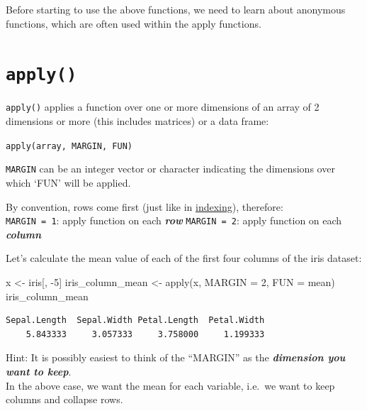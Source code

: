 \documentclass[
]{book}
\makeatletter
\newenvironment{Shaded}{\begin{snugshade}}{\end{snugshade}}
\newcommand{\AttributeTok}[1]{\textcolor[rgb]{0.77,0.63,0.00}{#1}}
\newcommand{\DecValTok}[1]{\textcolor[rgb]{0.00,0.00,0.81}{#1}}
\newcommand{\FunctionTok}[1]{\textcolor[rgb]{0.00,0.00,0.00}{#1}}
\newcommand{\NormalTok}[1]{#1}
\newcommand{\OtherTok}[1]{\textcolor[rgb]{0.56,0.35,0.01}{#1}}
\newcommand{\SpecialCharTok}[1]{\textcolor[rgb]{0.00,0.00,0.00}{#1}}
\newenvironment{kframe}{%
\medskip{}
\setlength{\fboxsep}{.8em}
 \def\at@end@of@kframe{}%
 \ifinner\ifhmode%
  \def\at@end@of@kframe{\end{minipage}}%
  \begin{minipage}{\columnwidth}%
 \fi\fi%
 \def\FrameCommand##1{\hskip\@totalleftmargin \hskip-\fboxsep
 \colorbox{shadecolor}{##1}\hskip-\fboxsep
     \hskip-\linewidth \hskip-\@totalleftmargin \hskip\columnwidth}%
 \MakeFramed {\advance\hsize-\width
   \@totalleftmargin\z@ \linewidth\hsize
   \@setminipage}}%
 {\par\unskip\endMakeFramed%
 \at@end@of@kframe}
\newenvironment{rmdblock}[1]
  {
  \begin{itemize}
  \renewcommand{\labelitemi}{
    \raisebox{-.7\height}[0pt][0pt]{
      {\setkeys{Gin}{width=3em,keepaspectratio}\texttt{[image: images/\#1]}}
    }
  }
  \setlength{\fboxsep}{1em}
  \begin{kframe}
  \item
  }
  {
  \end{kframe}
  \end{itemize}
  }
\newenvironment{note}
  {\begin{rmdblock}{note}}
  {\end{rmdblock}}
\newenvironment{info}
  {\begin{rmdblock}{info}}
  {\end{rmdblock}}
\makeatother
\begin{document}
Before starting to use the above functions, we need to learn about anonymous functions, which are often used within the apply functions.

\hypertarget{apply}{%
\section{\texorpdfstring{\texttt{apply()}}{apply()}}\label{apply}}

\begin{info}
\texttt{apply()} applies a function over one or more dimensions of an
array of 2 dimensions or more (this includes matrices) or a data frame:

\texttt{apply(array,\ MARGIN,\ FUN)}
\end{info}

\texttt{MARGIN} can be an integer vector or character indicating the dimensions over which `FUN' will be applied.

By convention, rows come first (just like in \protect\hyperlink{indexing}{indexing}), therefore:\\
\texttt{MARGIN\ =\ 1}: apply function on each \textbf{\emph{row}}
\texttt{MARGIN\ =\ 2}: apply function on each \textbf{\emph{column}}

Let's calculate the mean value of each of the first four columns of the iris dataset:

\begin{Shaded}
\begin{Highlighting}[]
\NormalTok{x }\OtherTok{\textless{}{-}}\NormalTok{ iris[, }\SpecialCharTok{{-}}\DecValTok{5}\NormalTok{]}
\NormalTok{iris\_column\_mean }\OtherTok{\textless{}{-}} \FunctionTok{apply}\NormalTok{(x, }\AttributeTok{MARGIN =} \DecValTok{2}\NormalTok{, }\AttributeTok{FUN =}\NormalTok{ mean) }
\NormalTok{iris\_column\_mean}
\end{Highlighting}
\end{Shaded}

\begin{verbatim}
Sepal.Length  Sepal.Width Petal.Length  Petal.Width 
    5.843333     3.057333     3.758000     1.199333 
\end{verbatim}

\begin{note}
Hint: It is possibly easiest to think of the ``MARGIN'' as the
\textbf{\emph{dimension you want to keep}}.\\
In the above case, we want the mean for each variable, i.e.~we want to
keep columns and collapse rows.
\end{note}
\end{document}
